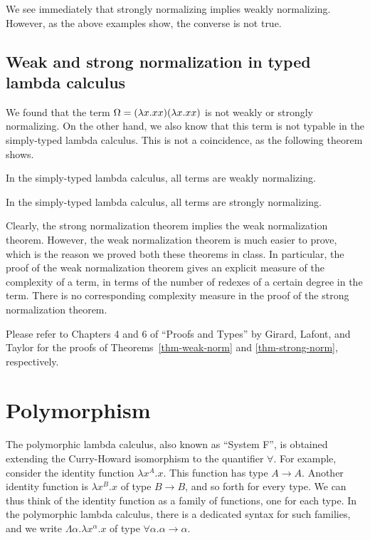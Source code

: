 \documentclass{article}
\begin{document}
We see immediately that strongly normalizing implies weakly
normalizing. However, as the above examples show, the converse is not
true. 

\subsection{Weak and strong normalization in typed lambda 
  calculus}

We found that the term $\Omega=(\lambda x.xx)(\lambda x.xx)$ is not weakly
or strongly normalizing. On the other hand, we also know that this
term is not typable in the simply-typed lambda calculus. This is not
a coincidence, as the following theorem shows.

\begin{theorem}\label{thm-weak-norm}
  In the simply-typed lambda calculus, all terms are weakly
  normalizing.
\end{theorem}

\begin{theorem}\label{thm-strong-norm}
  In the simply-typed lambda calculus, all terms are strongly
  normalizing.
\end{theorem}

Clearly, the strong normalization theorem implies the weak
normalization theorem. However, the weak normalization theorem is much
easier to prove, which is the reason we proved both these theorems in
class. In particular, the proof of the weak normalization theorem
gives an explicit measure of the complexity of a term, in terms of the
number of redexes of a certain degree in the term. There is no
corresponding complexity measure in the proof of the strong
normalization theorem.

Please refer to Chapters 4 and 6 of ``Proofs and Types'' by
Girard, Lafont, and Taylor {\cite{GLT89}} for the proofs of
Theorems~\ref{thm-weak-norm} and {\ref{thm-strong-norm}},
respectively. 

\section{Polymorphism}

The polymorphic lambda calculus, also known as ``System F'', is
obtained extending the Curry-Howard isomorphism to the quantifier
$\forall$. For example, consider the identity function $\lambda
x^A.x$.  This function has type $A\to A$. Another identity function is
$\lambda x^B.x$ of type $B\to B$, and so forth for every type. We can
thus think of the identity function as a family of functions, one for
each type. In the polymorphic lambda calculus, there is a dedicated
syntax for such families, and we write $\Lambda\alpha.\lambda
x^\alpha.x$ of type $\forall\alpha.\alpha\to\alpha$.
\end{document}
